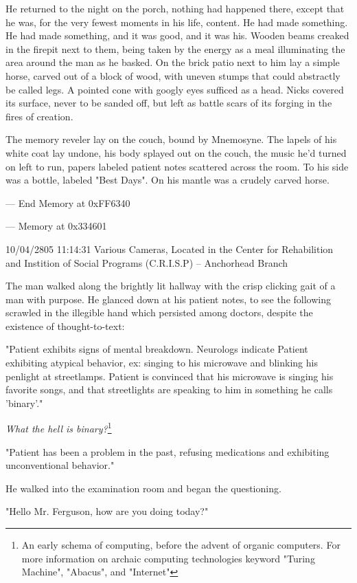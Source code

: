 \documentclass[12pt]{article}
\begin{document}
He returned to the night on the porch, nothing had happened there, except that he was, for the very fewest moments in his life, content. He had made something. He had made something, and it was good, and it was his. Wooden beams creaked in the firepit next to them, being taken by the energy as a meal illuminating the area around the man as he basked. On the brick patio next to him lay a simple horse, carved out of a block of wood, with uneven stumps that could abstractly be called legs. A pointed cone with googly eyes sufficed as a head. Nicks covered its surface, never to be sanded off, but left as battle scars of its forging in the fires of creation.

The memory reveler lay on the couch, bound by Mnemosyne. The lapels of his white coat lay undone, his body splayed out on the couch, the music he'd turned on left to run, papers labeled patient notes scattered across the room. To his side was a bottle, labeled "Best Days". On his mantle was a crudely carved horse.

--- End Memory at 0xFF6340

--- Memory at 0x334601

10/04/2805 11:14:31 Various Cameras, Located in the Center for Rehabilition and Instition of Social Programs (C.R.I.S.P) -- Anchorhead Branch

The man walked along the brightly lit hallway with the crisp clicking gait of a man with purpose. He glanced down at his patient notes, to see the following scrawled in the illegible hand which persisted among doctors, despite the existence of thought-to-text:

"Patient exhibits signs of mental breakdown. Neurologs indicate Patient exhibiting atypical behavior, ex: singing to his microwave and blinking his penlight at streetlamps. Patient is convinced that his microwave is singing his favorite songs, and that streetlights are speaking to him in something he calls 'binary'."

\emph{What the hell is binary?}\footnote{An early schema of computing, before the advent of organic computers. For more information on archaic computing technologies keyword "Turing Machine", "Abacus", and "Internet"}

"Patient has been a problem in the past, refusing medications and exhibiting unconventional behavior."

He walked into the examination room and began the questioning.

"Hello Mr. Ferguson, how are you doing today?"
\end{document}
